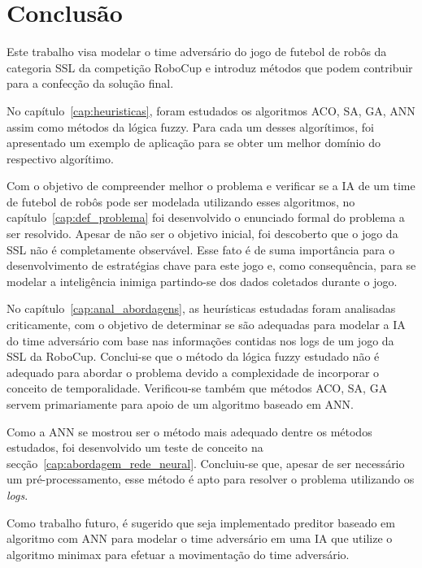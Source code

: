\chapter{Conclusão}\label{cap:conclusao}

Este trabalho visa modelar o time adversário do jogo de futebol de robôs
da categoria SSL da competição RoboCup e introduz métodos que podem contribuir
para a confecção da solução final.

No capítulo~\ref{cap:heuristicas}, foram estudados os algoritmos ACO, SA, GA,
ANN assim como métodos da lógica fuzzy. Para cada um desses algorítimos, foi
apresentado
um exemplo de aplicação para se obter um melhor domínio do respectivo
algorítimo.

Com o objetivo de compreender melhor o problema e verificar se a IA de um time
de
futebol de robôs pode ser modelada utilizando esses algoritmos, no
capítulo~\ref{cap:def_problema} foi desenvolvido o enunciado formal do problema
a ser resolvido.
Apesar de não ser o objetivo inicial, foi descoberto que o jogo da SSL não é
completamente observável. Esse fato é de suma importância para o desenvolvimento
de estratégias chave para este jogo e, como consequência, para se modelar a
inteligência inimiga partindo-se dos dados coletados durante o jogo.

No capítulo~\ref{cap:anal_abordagens}, as heurísticas estudadas foram analisadas
criticamente, com o objetivo de determinar se são adequadas para modelar a IA
do time adversário com base nas informações contidas nos logs de um jogo da SSL
da RoboCup. Conclui-se que o método da lógica fuzzy estudado não é adequado para
abordar o problema devido a complexidade de incorporar o conceito de
temporalidade.
Verificou-se também que métodos ACO, SA, GA servem primariamente para apoio de
um algoritmo baseado em ANN\@.

Como a ANN se mostrou ser o método mais adequado dentre os métodos estudados,
foi desenvolvido um teste de conceito na secção~\ref{cap:abordagem_rede_neural}.
Concluiu-se que, apesar de ser necessário um pré-processamento, esse
método é apto para resolver o problema utilizando os \textit{logs}.

Como trabalho futuro, é sugerido que seja implementado preditor baseado em
algoritmo com ANN para modelar o time adversário em uma IA que utilize o
algoritmo minimax para efetuar a movimentação do time adversário.



